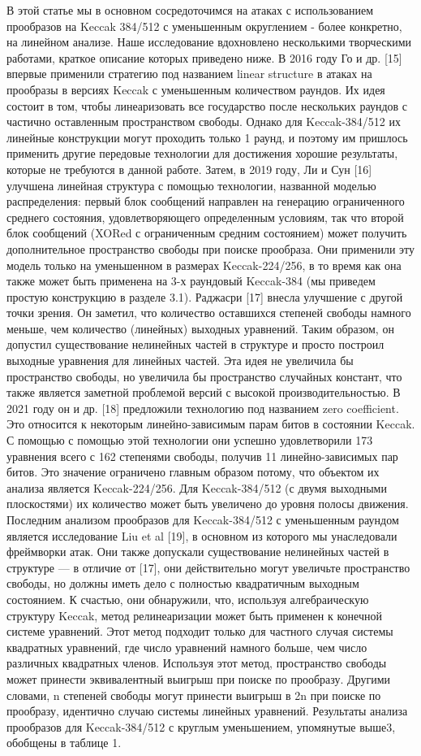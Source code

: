 \documentclass[utf8,14pt,a4paper,oneside,russian]{book}
\begin{document}
В этой статье мы в основном сосредоточимся на атаках с использованием прообразов на Keccak 384/512 с уменьшенным округлением - более конкретно, на линейном анализе. Наше исследование вдохновлено несколькими
творческими работами, краткое описание которых приведено ниже. В 2016 году Го и др. [15] впервые применили стратегию
под названием linear structure в атаках на прообразы в версиях Keccak с уменьшенным количеством раундов.
Их идея состоит в том, чтобы линеаризовать все государство после нескольких раундов с
частично оставленным пространством свободы. Однако для Keccak-384/512 их линейные конструкции могут проходить
только 1 раунд, и поэтому им пришлось применить другие передовые технологии для достижения
хорошие результаты, которые не требуются в данной работе. Затем, в 2019 году, Ли и Сун [16]
улучшена линейная структура с помощью технологии, названной моделью распределения:
первый блок сообщений направлен на генерацию ограниченного среднего состояния, удовлетворяющего определенным
условиям, так что второй блок сообщений (XORed с ограниченным средним
состоянием) может получить дополнительное пространство свободы при поиске прообраза. Они применили эту
модель только на уменьшенном в размерах Keccak-224/256, в то время как она также может быть применена на
3-х раундовый Keccak-384 (мы приведем простую конструкцию в разделе 3.1). Раджасри [17]
внесла улучшение с другой точки зрения. Он заметил, что количество оставшихся степеней свободы намного меньше, чем количество (линейных) выходных уравнений.
Таким образом, он допустил существование нелинейных частей в структуре и просто построил
выходные уравнения для линейных частей. Эта идея не увеличила бы пространство свободы,
но увеличила бы пространство случайных констант, что также является заметной проблемой
версий с высокой производительностью. В 2021 году он и др. [18] предложили технологию под названием zero
coefficient. Это относится к некоторым линейно-зависимым парам битов в состоянии Keccak. С помощью
с помощью этой технологии они успешно удовлетворили 173 уравнения всего с 162 степенями
свободы, получив 11 линейно-зависимых пар битов. Это значение ограничено главным
образом потому, что объектом их анализа является Keccak-224/256. Для Keccak-384/512 (с двумя
выходными плоскостями) их количество может быть увеличено до уровня полосы движения.
Последним анализом прообразов для Keccak-384/512 с уменьшенным раундом является исследование Liu et al [19],
в основном из которого мы унаследовали фреймворки атак. Они также
допускали существование нелинейных частей в структуре — в отличие от [17], они действительно могут
увеличьте пространство свободы, но должны иметь дело с полностью квадратичным выходным состоянием.
К счастью, они обнаружили, что, используя алгебраическую структуру Keccak,
метод релинеаризации может быть применен к конечной системе уравнений. Этот
метод подходит только для частного случая системы квадратных уравнений, где
число уравнений намного больше, чем число различных квадратных
членов. Используя этот метод, пространство свободы может принести эквивалентный выигрыш при
поиске по прообразу. Другими словами, n степеней свободы могут принести выигрыш в
2n при поиске по прообразу, идентично случаю системы линейных уравнений. Результаты
анализа прообразов для Keccak-384/512 с круглым уменьшением, упомянутые выше3,
обобщены в таблице 1.
\end{document}
